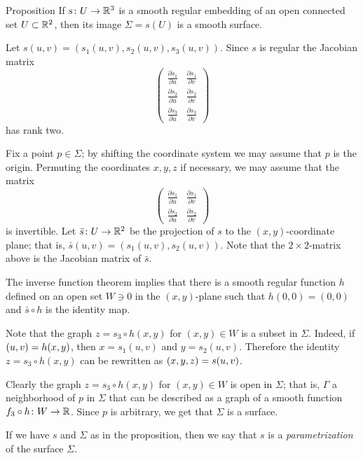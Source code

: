 \begin{thm}{Proposition}\label{prop:graph-chart}
If $s\colon U\to \mathbb{R}^3$ is a smooth regular embedding of an open connected set $U\subset \mathbb{R}^2$, then its image $\Sigma=s(U)$ is a smooth surface.
\end{thm}

Let $s(u,v)=(s_1(u,v),s_2(u,v),s_3(u,v))$.
Since $s$ is regular the Jacobian matrix
\[
\renewcommand\arraystretch{1.3}
\begin{pmatrix}
\tfrac{\partial s_1}{\partial u}&\tfrac{\partial s_1}{\partial v}\\
\tfrac{\partial s_2}{\partial u}&\tfrac{\partial s_2}{\partial v}\\
\tfrac{\partial s_3}{\partial u}&\tfrac{\partial s_3}{\partial v}
\end{pmatrix}
\]
has rank two.

Fix a point $p\in \Sigma$; by shifting the coordinate system we may assume that $p$ is the origin.
Permuting the coordinates $x,y,z$ if necessary, we may assume that 
the matrix 
\[
\renewcommand\arraystretch{1.3}
\begin{pmatrix}
\tfrac{\partial s_1}{\partial u}&\tfrac{\partial s_1}{\partial v}\\
\tfrac{\partial s_2}{\partial u}&\tfrac{\partial s_2}{\partial v}
\end{pmatrix}
\]
is invertible.
Let $\bar s\colon U\to\mathbb{R}^2$ be the projection of $s$ to the $(x,y)$-coordinate plane;
that is, $\bar s(u,v)=(s_1(u,v),s_2(u,v))$.
Note that the $2\times2$-matrix above is the Jacobian matrix of $\bar s$.

The inverse function theorem implies that there is a smooth regular function $h$ defined on an open set $W\ni 0$ in the $(x,y)$-plane
such that $h(0,0)=(0,0)$ and $\bar s\circ h$ is the identity map.

Note that the graph $z=s_3\circ h(x,y)$ for $(x,y)\in W$ is a subset in $\Sigma$.
Indeed, if $(u,v)\z=h(x,y)$, then $x=s_1(u,v)$ and $y=s_2(u,v)$.
Therefore the identity $z=s_3\circ h(x,y)$ can be rewritten as $(x,y,z)\z=s(u,v)$.

Clearly the graph $z=s_3\circ h(x,y)$ for $(x,y)\in W$ is open in $\Sigma$; %
that is, $\Gamma$ a neighborhood of $p$ in $\Sigma$ that can be described as a graph of a smooth function $f_3\circ h\colon W\to\mathbb{R}$.
Since $p$ is arbitrary, we get that $\Sigma$ is a surface.
\qeds

If we have $s$ and $\Sigma$ as in the proposition, then we say that $s$ is a \emph{parametrization} of the surface $\Sigma$. 

